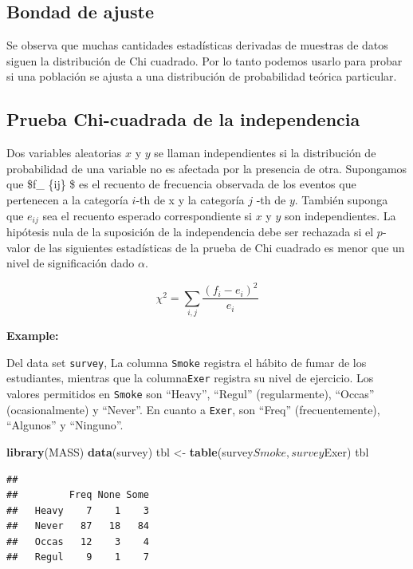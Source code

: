 \documentclass[]{article}
\newenvironment{Shaded}{\begin{snugshade}}{\end{snugshade}}
\newcommand{\KeywordTok}[1]{\textcolor[rgb]{0.13,0.29,0.53}{\textbf{{#1}}}}
\newcommand{\StringTok}[1]{\textcolor[rgb]{0.31,0.60,0.02}{{#1}}}
\newcommand{\NormalTok}[1]{{#1}}
\numberwithin{equation}{section}
\begin{document}
\subsection{Bondad de ajuste}\label{bondad-de-ajuste}

Se observa que muchas cantidades estadísticas derivadas de muestras de
datos siguen la distribución de Chi cuadrado. Por lo tanto podemos
usarlo para probar si una población se ajusta a una distribución de
probabilidad teórica particular.

\subsection{Prueba Chi-cuadrada de la
independencia}\label{prueba-chi-cuadrada-de-la-independencia}

Dos variables aleatorias \(x\) y \(y\) se llaman independientes si la
distribución de probabilidad de una variable no es afectada por la
presencia de otra. Supongamos que \$f\_ \{ij\} \$ es el recuento de
frecuencia observada de los eventos que pertenecen a la categoría
\(i\)-th de x y la categoría \(j\) -th de \(y\). También suponga que
\(e_{ij}\) sea el recuento esperado correspondiente si \(x\) y \(y\) son
independientes. La hipótesis nula de la suposición de la independencia
debe ser rechazada si el \(p\)-valor de las siguientes estadísticas de
la prueba de Chi cuadrado es menor que un nivel de significación dado
\(\alpha\).

\[
  \chi^2 = \sum_{i,j}\frac{(f_i - e_i)^2}{e_i}
\]

\textbf{Example:}

Del data set \texttt{survey}, La columna \texttt{Smoke} registra el
hábito de fumar de los estudiantes, mientras que la columna\texttt{Exer}
registra su nivel de ejercicio. Los valores permitidos en \texttt{Smoke}
son ``Heavy'', ``Regul'' (regularmente), ``Occas'' (ocasionalmente) y
``Never''. En cuanto a \texttt{Exer}, son ``Freq'' (frecuentemente),
``Algunos'' y ``Ninguno''.

\begin{Shaded}
\begin{Highlighting}[]
\KeywordTok{library}\NormalTok{(MASS)}
\KeywordTok{data}\NormalTok{(survey)}
\NormalTok{tbl <-}\StringTok{ }\KeywordTok{table}\NormalTok{(survey$Smoke,survey$Exer)}
\NormalTok{tbl}
\end{Highlighting}
\end{Shaded}

\begin{verbatim}
##        
##         Freq None Some
##   Heavy    7    1    3
##   Never   87   18   84
##   Occas   12    3    4
##   Regul    9    1    7
\end{verbatim}
\end{document}
